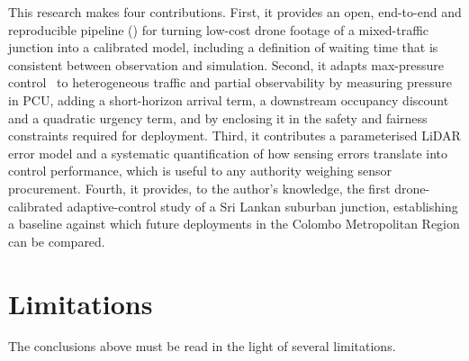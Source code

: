 This research makes four contributions. First, it provides an open, end-to-end and reproducible pipeline (\dtx{}) for turning low-cost drone footage of a mixed-traffic junction into a calibrated \sumo{} model, including a definition of waiting time that is consistent between observation and simulation. Second, it adapts max-pressure control~\cite{varaiya2013maxpressure} to heterogeneous traffic and partial observability by measuring pressure in PCU, adding a short-horizon arrival term, a downstream occupancy discount and a quadratic urgency term, and by enclosing it in the safety and fairness constraints required for deployment. Third, it contributes a parameterised LiDAR error model and a systematic quantification of how sensing errors translate into control performance, which is useful to any authority weighing sensor procurement. Fourth, it provides, to the author's knowledge, the first drone-calibrated adaptive-control study of a Sri Lankan suburban junction, establishing a baseline against which future deployments in the Colombo Metropolitan Region can be compared.

\section{Limitations}

The conclusions above must be read in the light of several limitations.

